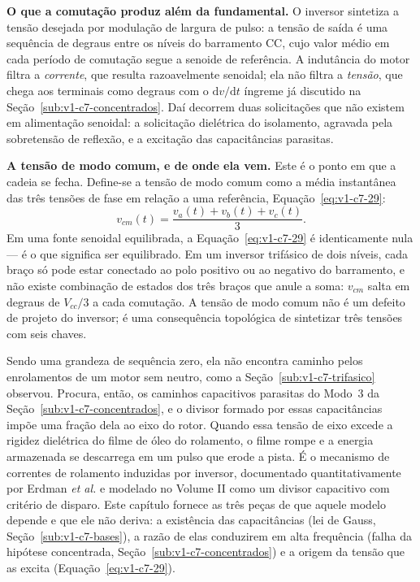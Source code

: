 \documentclass[12pt,a4paper]{article}
\numberwithin{equation}{section}
\numberwithin{table}{section}
\numberwithin{figure}{section}
\begin{document}
\textbf{O que a comutação produz além da fundamental.} O inversor sintetiza a
tensão desejada por modulação de largura de pulso: a tensão de saída é uma
sequência de degraus entre os níveis do barramento CC, cujo valor médio em cada
período de comutação segue a senoide de referência. A indutância do motor
filtra a \emph{corrente}, que resulta razoavelmente senoidal; ela não filtra a
\emph{tensão}, que chega aos terminais como degraus com o
$\mathrm{d}v/\mathrm{d}t$ íngreme já discutido na
Seção~\ref{sub:v1-c7-concentrados}. Daí decorrem duas solicitações que não
existem em alimentação senoidal: a solicitação dielétrica do isolamento, agravada
pela sobretensão de reflexão, e a excitação das capacitâncias parasitas.

\textbf{A tensão de modo comum, e de onde ela vem.} Este é o ponto em que a
cadeia se fecha. Define-se a tensão de modo comum como a média instantânea das
três tensões de fase em relação a uma referência,
Equação~\eqref{eq:v1-c7-29}:
\begin{equation}\label{eq:v1-c7-29}
v_{cm}(t) = \frac{v_a(t) + v_b(t) + v_c(t)}{3} .
\end{equation}
Em uma fonte senoidal equilibrada, a Equação~\eqref{eq:v1-c7-29} é
identicamente nula --- é o que significa ser equilibrado. Em um inversor
trifásico de dois níveis, cada braço só pode estar conectado ao polo positivo
ou ao negativo do barramento, e não existe combinação de estados dos três
braços que anule a soma: $v_{cm}$ salta em degraus de $V_{cc}/3$ a cada
comutação. A tensão de modo comum não é um defeito de projeto do inversor; é
uma consequência topológica de sintetizar três tensões com seis chaves.

Sendo uma grandeza de sequência zero, ela não encontra caminho pelos
enrolamentos de um motor sem neutro, como a
Seção~\ref{sub:v1-c7-trifasico} observou. Procura, então, os caminhos
capacitivos parasitas do Modo~3 da Seção~\ref{sub:v1-c7-concentrados}, e o
divisor formado por essas capacitâncias impõe uma fração dela ao eixo do rotor.
Quando essa tensão de eixo excede a rigidez dielétrica do filme de óleo do
rolamento, o filme rompe e a energia armazenada se descarrega em um pulso que
erode a pista. É o mecanismo de correntes de rolamento induzidas por inversor,
documentado quantitativamente por Erdman \textit{et al.} \cite{erdman} e
modelado no Volume II como um divisor capacitivo com critério de disparo. Este
capítulo fornece as três peças de que aquele modelo depende e que ele não
deriva: a existência das capacitâncias (lei de Gauss,
Seção~\ref{sub:v1-c7-bases}), a razão de elas conduzirem em alta frequência
(falha da hipótese concentrada, Seção~\ref{sub:v1-c7-concentrados}) e a origem
da tensão que as excita (Equação~\eqref{eq:v1-c7-29}).
\end{document}
